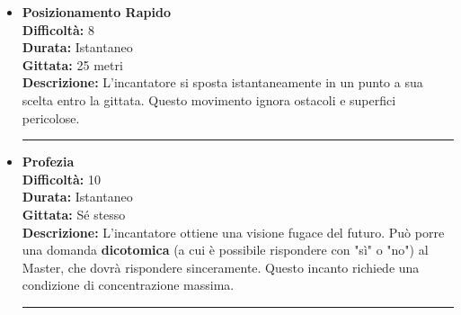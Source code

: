 \documentclass[./magie.tex]{subfiles}
\begin{document}
\begin{itemize}
\vspace{0.2cm}
\noindent
\begin{center}
\rule{\textwidth}{0.4pt} 
\end{center}
\vspace{0.2cm}

\item \textbf{Posizionamento Rapido} \\
\textbf{Difficoltà:} 8 \\
\textbf{Durata:} Istantaneo \\
\textbf{Gittata:} 25 metri \\
\textbf{Descrizione:} L'incantatore si sposta istantaneamente in un punto a sua scelta entro la gittata. Questo movimento ignora ostacoli e superfici pericolose.

\vspace{0.2cm}
\noindent
\begin{center}
\rule{\textwidth}{0.4pt} 
\end{center}
\vspace{0.2cm}

\item \textbf{Profezia} \\
\textbf{Difficoltà:} 10 \\
\textbf{Durata:} Istantaneo \\
\textbf{Gittata:} Sé stesso \\
\textbf{Descrizione:} L'incantatore ottiene una visione fugace del futuro. Può porre una domanda \textbf{dicotomica} (a cui è possibile rispondere con "sì" o "no") al Master, che dovrà rispondere sinceramente. Questo incanto richiede una condizione di concentrazione massima.

\vspace{0.2cm}
\noindent
\begin{center}
\rule{\textwidth}{0.4pt} 
\end{center}
\vspace{0.2cm}

\end{itemize}
\end{document}
